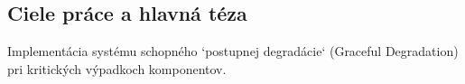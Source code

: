 \documentclass[../../../thesis.tex]{subfiles}
\begin{document}
    \subsection{Ciele práce a hlavná téza}
    Implementácia systému schopného `postupnej degradácie` (Graceful Degradation) pri kritických výpadkoch komponentov.
\end{document}
